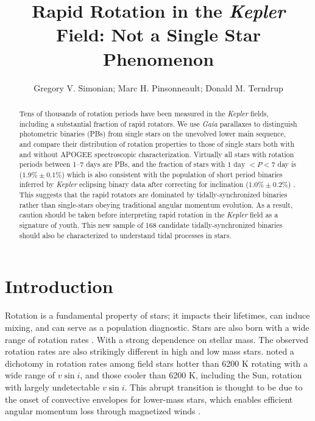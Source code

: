 \documentclass[manuscript]{aastex6}
\newcommand{\vsini}{\ensuremath{v \sin i}}
\newcommand{\Kepler}{\mbox{\textit{Kepler}}}
\newcommand{\Gaia}{\mbox{\textit{Gaia}}}
\newcommand{\gvs}{\authorcomment1}
\begin{document}
\title{Rapid Rotation in the \Kepler{} Field: Not a Single Star
Phenomenon}
\author{Gregory V. Simonian; Marc H. Pinsonneault; Donald M. Terndrup}

\begin{abstract}
    Tens of thousands of rotation periods have been measured in the
    \Kepler{} fields, including a substantial fraction of rapid rotators. We 
    use \Gaia{} parallaxes to distinguish photometric binaries (PBs) from
    single stars on the unevolved lower main sequence, and compare their
    distribution of rotation properties to those of single stars both with and 
    without APOGEE spectroscopic characterization. Virtually all stars 
    with rotation periods between 1--7 days are PBs, and the fraction of stars
    with \(1 \textrm{ day } < P < 7\) day is (\(1.9\% \pm 0.1\%\)) which
    is also consistent with the population of short period binaries inferred 
    by \Kepler{} eclipsing binary data after correcting for inclination
    (\(1.0\% \pm 0.2\%\))
    \gvs{Not quite as concordant as I would have liked}. This suggests that the rapid rotators 
    are dominated by tidally-synchronized binaries rather than single-stars 
    obeying traditional angular momentum evolution. As a result, caution 
    should be taken before interpreting rapid rotation in the \Kepler{} field 
    as a signature of youth. This new sample of 168 candidate 
    tidally-synchronized binaries should also be characterized to understand 
    tidal processes in stars.
\end{abstract}

\section{Introduction}

Rotation is a fundamental property of stars; it impacts their lifetimes, can
induce mixing, and can serve as a population diagnostic. Stars are also born 
with a wide range of rotation rates \citep{Attridge92, Herbst00, Henderson12}.
With a strong dependence on stellar mass. The observed rotation rates are also
strikingly different in high and low mass stars. \citet{Kraft67} noted a 
dichotomy in rotation rates among field stars hotter than 6200 K rotating 
with a wide range of \vsini, and those cooler than 6200 K, including the Sun, 
rotation with largely undetectable \vsini. This abrupt transition is thought to
be due to the onset of convective envelopes for lower-mass stars, which 
enables efficient angular momentum loss through magnetized winds 
\citep{Parker58,Weber67}.
\end{document}

